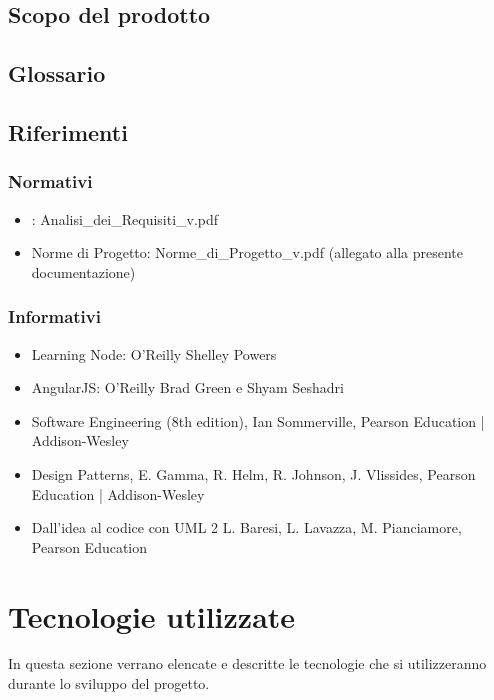 \subsection{Scopo del prodotto}
\label{1.2}
\Prodotto{}

\subsection{Glossario}%
\label{1.3}
\Glossario{}

\subsection{Riferimenti}
\label{1.4}

\subsubsection{Normativi}
\label{1.4.1}
\begin{itemize}
\item {}: Analisi\_{}dei\_{}Requisiti\_{}v\versioneNormeDiProgetto{}.pdf
\item Norme di Progetto: Norme\_{}di\_{}Progetto\_{}v\versioneNormeDiProgetto{}.pdf  (allegato alla presente documentazione)\\
\end{itemize}

\subsubsection{Informativi}
\label{1.4.2}
\begin{itemize}
\item Learning Node: O'Reilly Shelley Powers
\item AngularJS: O'Reilly Brad Green e Shyam Seshadri
\item Software Engineering (8th edition), Ian Sommerville, Pearson Education | Addison-Wesley
\item Design Patterns, E. Gamma, R. Helm, R. Johnson, J. Vlissides, Pearson Education | Addison-Wesley
\item Dall'idea al codice con UML 2       L. Baresi, L. Lavazza, M. Pianciamore, Pearson Education
\end{itemize}

\newpage
\section{Tecnologie utilizzate}
In questa sezione verrano elencate e descritte le tecnologie che si utilizzeranno durante lo sviluppo del progetto.

